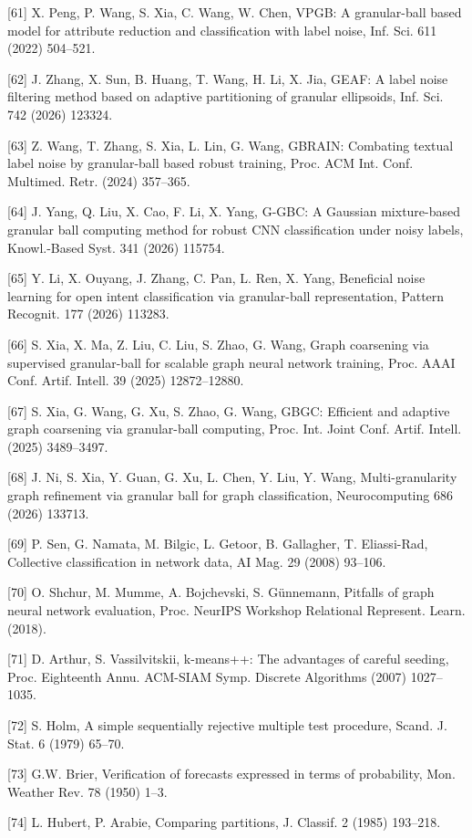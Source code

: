 {[}61{]} X. Peng, P. Wang, S. Xia, C. Wang, W. Chen, VPGB: A granular-ball based model for attribute reduction and classification with label noise, Inf. Sci. 611 (2022) 504--521.

{[}62{]} J. Zhang, X. Sun, B. Huang, T. Wang, H. Li, X. Jia, GEAF: A label noise filtering method based on adaptive partitioning of granular ellipsoids, Inf. Sci. 742 (2026) 123324.

{[}63{]} Z. Wang, T. Zhang, S. Xia, L. Lin, G. Wang, GBRAIN: Combating textual label noise by granular-ball based robust training, Proc. ACM Int. Conf. Multimed. Retr. (2024) 357--365.

{[}64{]} J. Yang, Q. Liu, X. Cao, F. Li, X. Yang, G-GBC: A Gaussian mixture-based granular ball computing method for robust CNN classification under noisy labels, Knowl.-Based Syst. 341 (2026) 115754.

{[}65{]} Y. Li, X. Ouyang, J. Zhang, C. Pan, L. Ren, X. Yang, Beneficial noise learning for open intent classification via granular-ball representation, Pattern Recognit. 177 (2026) 113283.

{[}66{]} S. Xia, X. Ma, Z. Liu, C. Liu, S. Zhao, G. Wang, Graph coarsening via supervised granular-ball for scalable graph neural network training, Proc. AAAI Conf. Artif. Intell. 39 (2025) 12872--12880.

{[}67{]} S. Xia, G. Wang, G. Xu, S. Zhao, G. Wang, GBGC: Efficient and adaptive graph coarsening via granular-ball computing, Proc. Int. Joint Conf. Artif. Intell. (2025) 3489--3497.

{[}68{]} J. Ni, S. Xia, Y. Guan, G. Xu, L. Chen, Y. Liu, Y. Wang, Multi-granularity graph refinement via granular ball for graph classification, Neurocomputing 686 (2026) 133713.

{[}69{]} P. Sen, G. Namata, M. Bilgic, L. Getoor, B. Gallagher, T. Eliassi-Rad, Collective classification in network data, AI Mag. 29 (2008) 93--106.

{[}70{]} O. Shchur, M. Mumme, A. Bojchevski, S. Günnemann, Pitfalls of graph neural network evaluation, Proc. NeurIPS Workshop Relational Represent. Learn. (2018).

{[}71{]} D. Arthur, S. Vassilvitskii, k-means++: The advantages of careful seeding, Proc. Eighteenth Annu. ACM-SIAM Symp. Discrete Algorithms (2007) 1027--1035.

{[}72{]} S. Holm, A simple sequentially rejective multiple test procedure, Scand. J. Stat. 6 (1979) 65--70.

{[}73{]} G.W. Brier, Verification of forecasts expressed in terms of probability, Mon. Weather Rev. 78 (1950) 1--3.

{[}74{]} L. Hubert, P. Arabie, Comparing partitions, J. Classif. 2 (1985) 193--218.
